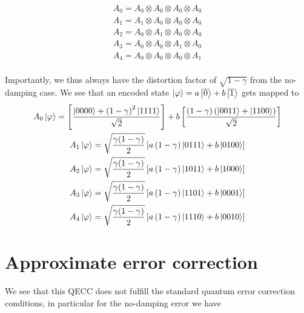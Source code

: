 \documentclass[twoside]{article}
\begin{document}
\begin{gather}
A_{0} = A_0\otimes A_0\otimes A_0\otimes A_0\\
A_{1} = A_1\otimes A_0\otimes A_0\otimes A_0\\
A_{2} = A_0\otimes A_1\otimes A_0\otimes A_0\\
A_{3} = A_0\otimes A_0\otimes A_1\otimes A_0\\
A_{4} = A_0\otimes A_0\otimes A_0\otimes A_1\\
\end{gather}

Importantly, we thus always have the distortion factor of $\sqrt{1-\gamma}$ from the no-damping case. We see that an encoded state $\Ket{\varphi} = a\Ket{\overline{0}}+b\Ket{\overline{1}}$ gets mapped to
\begin{gather}
A_{0}\Ket{\varphi}= \left[\frac{\Ket{0000}+\left(1-\gamma\right)^2\Ket{1111}}{\sqrt{2}}\right] + b\left[ \frac{\left(1-\gamma\right)\left(\Ket{0011}+\Ket{1100}\right)}{\sqrt{2}}\right]\\
A_{1}\Ket{\varphi} = \sqrt{\frac{\gamma(1-\gamma)}{2}}\left[a\left(1-\gamma\right)\Ket{0111}+b\Ket{0100}\right]\\
A_{2}\Ket{\varphi} = \sqrt{\frac{\gamma(1-\gamma)}{2}}\left[a\left(1-\gamma\right)\Ket{1011}+b\Ket{1000}\right]\\
A_{3}\Ket{\varphi} = \sqrt{\frac{\gamma(1-\gamma)}{2}}\left[a\left(1-\gamma\right)\Ket{1101}+b\Ket{0001}\right]\\
A_{4}\Ket{\varphi} = \sqrt{\frac{\gamma(1-\gamma)}{2}}\left[a\left(1-\gamma\right)\Ket{1110}+b\Ket{0010}\right]\\
\end{gather}
\section*{Approximate error correction}
We see that this QECC does not fulfill the standard quantum error correction conditions, in particular for the no-damping error we have
\end{document}
